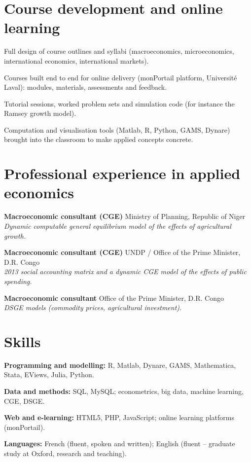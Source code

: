\documentclass[11pt,letterpaper]{article}
\newenvironment{datelist}
  {\begin{description}[style=multiline,leftmargin=2.75cm,labelwidth=2.55cm,
     labelsep=0.2cm,font=\normalfont\small\color{soft},
     itemsep=0.45em,topsep=0.25em,parsep=0.15em]}
  {\end{description}}
\newcommand{\dotsep}{\;\textcolor{soft}{\textbullet}\;}
\newcommand{\meta}[1]{{\small\itshape\color{soft}#1}}
\begin{document}
\section{Course development and online learning}
\begin{tight}
  \item Full design of course outlines and syllabi (macroeconomics, microeconomics, international economics, international markets).
  \item Courses built end to end for online delivery (monPortail platform, Université Laval): modules, materials, assessments and feedback.
  \item Tutorial sessions, worked problem sets and simulation code (for instance the Ramsey growth model).
  \item Computation and visualisation tools (Matlab, R, Python, GAMS, Dynare) brought into the classroom to make applied concepts concrete.
\end{tight}
\section{Professional experience in applied economics}
\begin{datelist}
  \item[2018--2019] \textbf{Macroeconomic consultant (CGE)} \dotsep Ministry of Planning, Republic of Niger\\
    \meta{Dynamic computable general equilibrium model of the effects of agricultural growth.}
  \item[2016--2017] \textbf{Macroeconomic consultant (CGE)} \dotsep UNDP / Office of the Prime Minister, D.R. Congo\\
    \meta{2013 social accounting matrix and a dynamic CGE model of the effects of public spending.}
  \item[2013--2015] \textbf{Macroeconomic consultant} \dotsep Office of the Prime Minister, D.R. Congo\\
    \meta{DSGE models (commodity prices, agricultural investment).}
\end{datelist}
\section{Skills}
\begin{plainlist}
  \item \textbf{Programming and modelling:} R, Matlab, Dynare, GAMS, Mathematica, Stata, EViews, Julia, Python.
  \item \textbf{Data and methods:} SQL, MySQL; econometrics, big data, machine learning, CGE, DSGE.
  \item \textbf{Web and e-learning:} HTML5, PHP, JavaScript; online learning platforms (monPortail).
  \item \textbf{Languages:} French (fluent, spoken and written); English (fluent -- graduate study at Oxford, research and teaching).
\end{plainlist}
\end{document}
